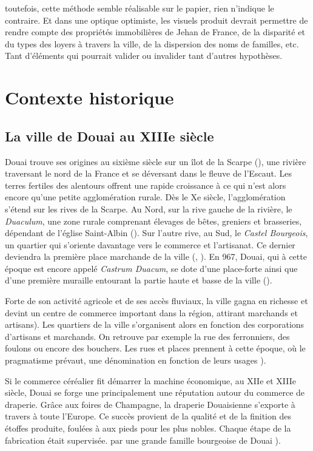 toutefois, cette méthode semble réalisable sur le papier, rien n'indique le contraire. Et dans une optique optimiste,  les visuels produit devrait permettre de rendre compte des propriétés immobilières de Jehan de France, de la disparité et du types des loyers à travers  la ville, de la dispersion des noms de familles, etc.
Tant d'éléments qui pourrait valider ou invalider tant d'autres hypothèses. 

\section{Contexte historique}
\subsection{La ville de Douai au XIIIe siècle}

Douai trouve ses origines au sixième siècle sur un îlot de la Scarpe (\cite{mestayer_douai_2016}), une rivière traversant le nord de la France et se déversant dans le fleuve de l'Escaut. Les terres fertiles des alentours offrent une rapide croissance à ce qui n'est alors encore qu'une petite agglomération rurale. Dès le Xe siècle, l'agglomération s'étend sur les rives de la Scarpe. Au Nord, sur la rive gauche de la rivière, le \textit{Duaculum}, une zone rurale comprenant élevages de bêtes, greniers et brasseries, dépendant de l'église Saint-Albin (\cite{mestayer_douai_2016}). Sur l'autre rive, au Sud, le \textit{Castel Bourgeois}, un quartier qui s'oriente davantage vers le commerce et l'artisanat. Ce dernier deviendra la première place marchande de la ville (\cite{OfficeDuTourisme_douai_2016}, \cite{netteghem_histoire_2021}). En 967, Douai, qui à cette époque est encore appelé \textit{Castrum Duacum}, se dote d'une place-forte ainsi que d'une première muraille entourant la partie haute et basse de la ville (\cite{mestayer_douai_2016}). 

Forte de son activité agricole et de ses accès fluviaux, la ville gagna en richesse et devint un centre de commerce important dans la région, attirant marchands et artisans\cite{clisant_vie_2003}). Les quartiers de la ville s'organisent alors en fonction des corporations d'artisans et marchands. On retrouve par exemple la rue des ferronniers, des foulons ou encore des bouchers. Les rues et places prennent à cette époque, où le pragmatisme  prévaut, une dénomination en fonction de leurs usages \cite{colin_decouvrez_2001}). 

Si le commerce céréalier fit démarrer la machine économique, au XIIe et XIIIe siècle, Douai se forge une principalement une réputation autour du commerce de draperie. Grâce aux foires de Champagne, la draperie Douaisienne s'exporte à travers à toute l'Europe. Ce succès provient de la qualité et de la finition des étoffes produite, foulées  à  aux pieds pour les plus nobles. Chaque étape de la fabrication était supervisée. par une grande famille bourgeoise de Douai \cite{clisant_vie_2003}).

